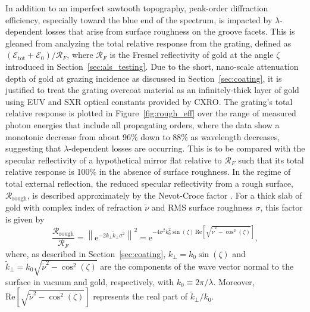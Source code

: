\documentclass{aastex63}
\begin{document}
In addition to an imperfect sawtooth topography, peak-order diffraction efficiency, especially toward the blue end of the spectrum, is impacted by $\lambda$-dependent losses that arise from surface roughness on the groove facets. 
This is gleaned from analyzing the total relative response from the grating, defined as $\left( \mathcal{E}_{\text{tot}} + \mathcal{E}_0 \right) / \mathcal{R}_{F}$, where $\mathcal{R}_{F}$ is the Fresnel reflectivity of gold at the angle $\zeta$ introduced in Section~\ref{sec:als_testing}. 
Due to the short, nano-scale attenuation depth of gold at grazing incidence as discussed in Section~\ref{sec:coating}, it is justified to treat the grating overcoat material as an infinitely-thick layer of gold using EUV and SXR optical constants provided by CXRO.
The grating's total relative response is plotted in Figure~\ref{fig:rough_eff} over the range of measured photon energies that include all propagating orders, where the data show a monotonic decrease from about 96\% down to 88\% as wavelength decreases, suggesting that $\lambda$-dependent losses are occurring. 
This is to be compared with the specular reflectivity of a hypothetical mirror flat relative to $\mathcal{R}_{F}$ such that its total relative response is 100\% in the absence of surface roughness. 
In the regime of total external reflection, the reduced specular reflectivity from a rough surface, $\mathcal{R}_{\text{rough}}$, is described approximately by the Nevot-Croce factor \citep{Nevot80,deBoer95,Gibaud2009}. 
For a thick slab of gold with complex index of refraction $\tilde{\nu}$ and RMS surface roughness $\sigma$, this factor is given by 
\begin{equation}\label{eq:nc_factor}
 \frac{\mathcal{R}_{\text{rough}}}{\mathcal{R}_{F}} = \left\| \mathrm{e}^{-2 k_{\perp} \tilde{k}_{\perp} \sigma^2 } \right\|^2 = \mathrm{e}^{-4 \sigma^2 k_0^2 \sin \left( \zeta \right) \, \text{Re} \left[ \sqrt{\tilde{\nu}^2 - \cos^2 \left( \zeta \right)} \right]} ,
 \end{equation}
where, as described in Section~\ref{sec:coating}, $k_{\perp} = k_0 \sin \left( \zeta \right)$ and $\tilde{k}_{\perp} = k_0 \sqrt{\tilde{\nu}^2 - \cos^2 \left( \zeta \right)}$ are the components of the wave vector normal to the surface in vacuum and gold, respectively, with $k_0 \equiv 2 \pi / \lambda$. 
Moreover, $\text{Re} \! \left[ \sqrt{\tilde{\nu}^2 - \cos^2 \left( \zeta \right)} \right]$ represents the real part of $\tilde{k}_{\perp} / k_0$. 
\end{document}
